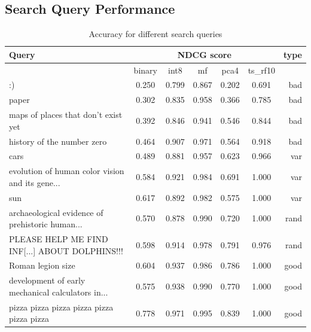 \subsection{Search Query Performance}
\begin{table}[h]
    \centering
    \begin{tabular}{l|ccccc|r}
        \toprule
        Query                                                           & \multicolumn{5}{c}{NDCG score} & type                                    \\
        \hline
                                                                        & binary                         & int8  & mf    & pca4  & ts\_rf10 &      \\
        \hline
        :)                                                              & 0.250                          & 0.799 & 0.867 & 0.202 & 0.691    & bad  \\
        paper                                                           & 0.302                          & 0.835 & 0.958 & 0.366 & 0.785    & bad  \\
        maps of places that don't exist yet                             & 0.392                          & 0.846 & 0.941 & 0.546 & 0.844    & bad  \\
        history of the number zero                                      & 0.464                          & 0.907 & 0.971 & 0.564 & 0.918    & bad  \\
        cars                                                            & 0.489                          & 0.881 & 0.957 & 0.623 & 0.966    & var  \\
        \footnotesize evolution of human color vision and its gene...   & 0.584                          & 0.921 & 0.984 & 0.691 & 1.000    & var  \\
        sun                                                             & 0.617                          & 0.892 & 0.982 & 0.575 & 1.000    & var  \\
        \footnotesize archaeological evidence of prehistoric human...   & 0.570                          & 0.878 & 0.990 & 0.720 & 1.000    & rand \\
        \scriptsize PLEASE HELP ME FIND INF[...] ABOUT DOLPHINS!!!      & 0.598                          & 0.914 & 0.978 & 0.791 & 0.976    & rand \\
        Roman legion size                                               & 0.604                          & 0.937 & 0.986 & 0.786 & 1.000    & good \\
        \footnotesize development of early mechanical calculators in... & 0.575                          & 0.938 & 0.990 & 0.770 & 1.000    & good \\
        pizza pizza pizza pizza pizza pizza pizza                       & 0.778                          & 0.971 & 0.995 & 0.839 & 1.000    & good \\
        \bottomrule
    \end{tabular}
    \caption{Accuracy for different search queries}
    \label{queryanalysis}
\end{table}

